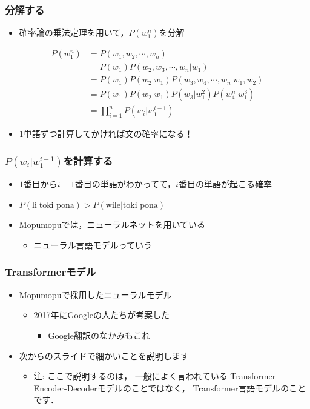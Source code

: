 \documentclass[14pt]{beamer}
\begin{document}
\begin{frame}
	\frametitle{分解する}

	\begin{itemize}
		\item 確率論の乗法定理を用いて，$P(w_1^n)$を分解
	\end{itemize}
	\begin{align*}
		P(w_1^n)
			& = P(w_1, w_2, \cdots, w_n) \\
			& = P(w_1) P(w_2, w_3, \cdots, w_n | w_1) \\
			& = P(w_1) P(w_2 | w_1) P(w_3, w_4, \cdots, w_n | w_1, w_2) \\
			& = P(w_1) P(w_2 | w_1) P(w_3 | w_1^2) P(w_4^n | w_1^3) \\
			& = \prod_{i=1}^{n} P(w_i | w_1^{i-1})
	\end{align*}

	\begin{itemize}
		\item 1単語ずつ計算してかければ文の確率になる！
	\end{itemize}

\end{frame}

\begin{frame}
	\frametitle{$P(w_i | w_1^{i-1})$を計算する}

	\begin{itemize}
		\item $1$番目から$i-1$番目の単語がわかってて，$i$番目の単語が起こる確率
		\item $P(\text{li} | \text{toki pona}) > P(\text{wile} | \text{toki pona})$ 
		\item Mopumopuでは，ニューラルネットを用いている
			\begin{itemize}
				\item ニューラル言語モデルっていう
			\end{itemize}
	\end{itemize}
\end{frame}

\begin{frame}
	\frametitle{Transformerモデル}

	\begin{itemize}
		\item Mopumopuで採用したニューラルモデル
			\begin{itemize}
				\item 2017年にGoogleの人たちが考案した
					\begin{itemize}
						\item Google翻訳のなかみもこれ
					\end{itemize}
			\end{itemize}
		\item 次からのスライドで細かいことを説明します
			\begin{itemize}
				\item {\scriptsize 注: ここで説明するのは，
					一般によく言われている
					Transformer Encoder-Decoderモデルのことではなく，
					Transformer言語モデルのことです．}
			\end{itemize}
	\end{itemize}
\end{frame}
\end{document}
